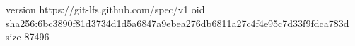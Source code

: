 version https://git-lfs.github.com/spec/v1
oid sha256:6bc3890f81d3734d1d5a6847a9ebea276db6811a27c4f4e95c7d33f9fdca783d
size 87496
